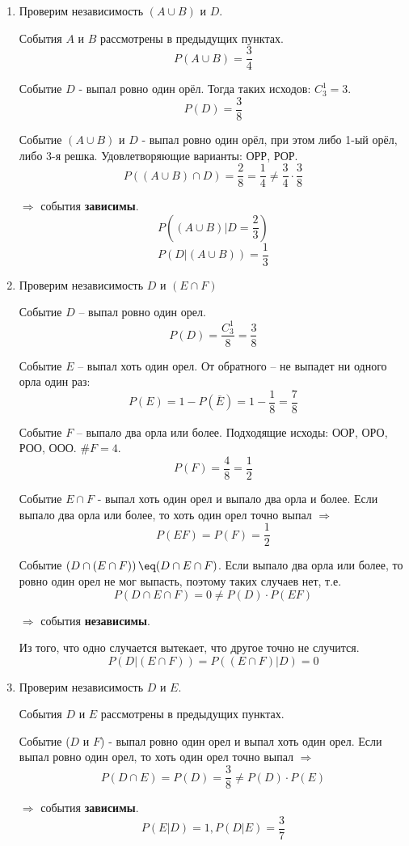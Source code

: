 \begin{enumerate}[label=\alph*)]
	\item Проверим независимость $(A \cup B)$ и $D$.
	
	События $A$ и $B$ рассмотрены в предыдущих пунктах.
	\[ P(A \cup B) = \dfrac{3}{4} \]
	
	Событие $D$ - выпал ровно один орёл. Тогда таких исходов: $C_3^1 = 3$.
	\[ P(D) = \dfrac{3}{8} \]
	
	Событие $(A \cup B)$ и $D$ - выпал ровно один орёл, при этом либо 1-ый орёл, либо 3-я решка. Удовлетворяющие варианты: ОРР, РОР.
	\[ P \left( (A \cup B) \cap D \right) = \dfrac{2}{8} = \dfrac{1}{4} \ne \dfrac{3}{4} \cdot \dfrac{3}{8} \]
	
	$\Rightarrow$ события \textbf{зависимы}.
	\[ P \left( (A \cup B) | D = \dfrac{2}{3} \right) \]
	\[ P \left( D | (A \cup B) \right) = \dfrac{1}{3} \]
	
	\item Проверим независимость $D$ и $(E \cap F)$
	
	Событие $D$ – выпал ровно один орел.
	\[ P(D) = \dfrac{C_3^1}{8} = \dfrac{3}{8} \]
	
	Событие $E$ – выпал хоть один орел. От обратного – не выпадет ни одного орла один раз:
	\[ P(E) = 1 - P(\bar E) = 1 - \dfrac{1}{8} = \dfrac{7}{8} \]
	
	Событие $F$ – выпало два орла или более. Подходящие исходы: ООР, ОРО, РОО, ООО. $\# F = 4$.
	\[ P(F) = \dfrac{4}{8} = \dfrac{1}{2} \]
	
	Событие $E \cap F$ - выпал хоть один орел и выпало два орла и более. Если выпало два орла или более, то хоть один орел точно выпал $\Rightarrow$
	\[ P(EF) = P(F) = \dfrac{1}{2} \]
	
	Событие $\left( D \cap (E \cap F) \right) \eq (D \cap E \cap F)$. Если выпало два орла или более, то ровно один орел не мог выпасть, поэтому таких случаев нет, т.е.
	\[ P \left( D \cap E \cap F \right) = 0 \ne P(D) \cdot P(EF) \]
	
	$\Rightarrow$ события \textbf{независимы}.
	
	Из того, что одно случается вытекает, что другое точно не случится.
	\[ P(D|(E \cap F)) = P((E \cap F) | D) = 0 \]
	
	\item Проверим независимость $D$ и $E$.
	
	События $D$ и $E$ рассмотрены в предыдущих пунктах.
	
	Событие ($D$ и $F$) - выпал ровно один орел и выпал хоть один орел. Если выпал ровно один орел, то хоть один орел точно выпал $\Rightarrow$
	\[ P(D \cap E) = P(D) = \dfrac{3}{8} \ne P(D) \cdot P(E) \]
	
	$\Rightarrow$ события \textbf{зависимы}.
	\[ P(E|D) = 1, P(D|E) = \dfrac{3}{7} \]
\end{enumerate}

